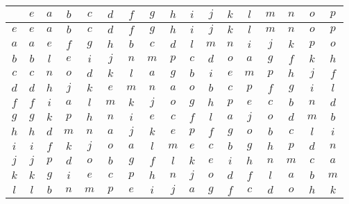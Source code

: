 \documentclass[12pt]{amsart}
\begin{document}
\begin{center}\begin{tabular}{c|cccccccccccccccc}
	&\(e\) &\(a\) &\(b\) &\(c\) &\(d\) &\(f\) &\(g\) &\(h\) &\(i\) &\(j\) &\(k\) &\(l\) &\(m\) &\(n\) &\(o\) &\(p\) \\\hline
	\(e\)  & \(e\)  & \(a\)  & \(b\)  & \(c\)  & \(d\)  & \(f\)  & \(g\)  & \(h\)  & \(i\)  & \(j\)  & \(k\)  & \(l\)  & \(m\)  & \(n\)  & \(o\)  & \(p\)  \\
	\(a\)  & \(a\)  & \(e\)  & \(f\)  & \(g\)  & \(h\)  & \(b\)  & \(c\)  & \(d\)  & \(l\)  & \(m\)  & \(n\)  & \(i\)  & \(j\)  & \(k\)  & \(p\)  & \(o\)  \\
	\(b\)  & \(b\)  & \(l\)  & \(e\)  & \(i\)  & \(j\)  & \(n\)  & \(m\)  & \(p\)  & \(c\)  & \(d\)  & \(o\)  & \(a\)  & \(g\)  & \(f\)  & \(k\)  & \(h\)  \\
	\(c\)  & \(c\)  & \(n\)  & \(o\)  & \(d\)  & \(k\)  & \(l\)  & \(a\)  & \(g\)  & \(b\)  & \(i\)  & \(e\)  & \(m\)  & \(p\)  & \(h\)  & \(j\)  & \(f\)  \\
	\(d\)  & \(d\)  & \(h\)  & \(j\)  & \(k\)  & \(e\)  & \(m\)  & \(n\)  & \(a\)  & \(o\)  & \(b\)  & \(c\)  & \(p\)  & \(f\)  & \(g\)  & \(i\)  & \(l\)  \\
	\(f\)  & \(f\)  & \(i\)  & \(a\)  & \(l\)  & \(m\)  & \(k\)  & \(j\)  & \(o\)  & \(g\)  & \(h\)  & \(p\)  & \(e\)  & \(c\)  & \(b\)  & \(n\)  & \(d\)  \\
	\(g\)  & \(g\)  & \(k\)  & \(p\)  & \(h\)  & \(n\)  & \(i\)  & \(e\)  & \(c\)  & \(f\)  & \(l\)  & \(a\)  & \(j\)  & \(o\)  & \(d\)  & \(m\)  & \(b\)  \\
	\(h\)  & \(h\)  & \(d\)  & \(m\)  & \(n\)  & \(a\)  & \(j\)  & \(k\)  & \(e\)  & \(p\)  & \(f\)  & \(g\)  & \(o\)  & \(b\)  & \(c\)  & \(l\)  & \(i\)  \\
	\(i\)  & \(i\)  & \(f\)  & \(k\)  & \(j\)  & \(o\)  & \(a\)  & \(l\)  & \(m\)  & \(e\)  & \(c\)  & \(b\)  & \(g\)  & \(h\)  & \(p\)  & \(d\)  & \(n\)  \\
	\(j\)  & \(j\)  & \(p\)  & \(d\)  & \(o\)  & \(b\)  & \(g\)  & \(f\)  & \(l\)  & \(k\)  & \(e\)  & \(i\)  & \(h\)  & \(n\)  & \(m\)  & \(c\)  & \(a\)  \\
	\(k\)  & \(k\)  & \(g\)  & \(i\)  & \(e\)  & \(c\)  & \(p\)  & \(h\)  & \(n\)  & \(j\)  & \(o\)  & \(d\)  & \(f\)  & \(l\)  & \(a\)  & \(b\)  & \(m\)  \\
	\(l\)  & \(l\)  & \(b\)  & \(n\)  & \(m\)  & \(p\)  & \(e\)  & \(i\)  & \(j\)  & \(a\)  & \(g\)  & \(f\)  & \(c\)  & \(d\)  & \(o\)  & \(h\)  & \(k\)  \\

\end{tabular}
\end{center}
\end{document}
